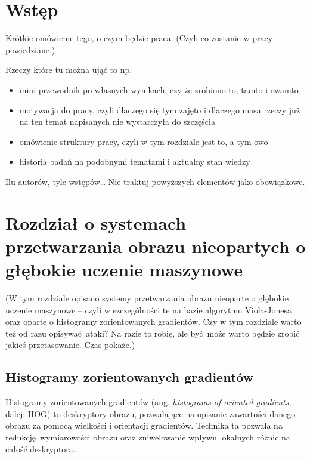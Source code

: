 \documentclass[12pt,a4paper,leqno,oneside,titlepage]{book}
\begin{document}
\mainmatter

\chapter*{Wstęp}

Krótkie omówienie tego, o czym będzie praca. (Czyli co zostanie w pracy powiedziane.)

Rzeczy które tu można ująć to np. 
\begin{itemize}
\item mini-przewodnik po własnych wynikach, czy że zrobiono to, tamto i owamto
\item motywacja do pracy, czyli dlaczego się tym zajęto i dlaczego masa rzeczy już na ten temat napisanych nie wystarczyła do szczęścia
\item omówienie struktury pracy, czyli w tym rozdziale jest to, a tym owo
\item historia badań na podobnymi tematami i aktualny stan wiedzy
\end{itemize}

Ilu autorów, tyle wstępów\ldots{} Nie traktuj powyższych elementów jako obowiązkowe.

\chapter{Rozdział o systemach przetwarzania obrazu nieopartych o głębokie uczenie maszynowe}%

(W tym rozdziale opisano systemy przetwarzania obrazu nieoparte o głębokie uczenie maszynowe -- czyli w szczególności te na bazie algorytmu Viola-Jonesa oraz oparte o histogramy zorientowanych gradientów.
Czy w tym rozdziale warto też od razu opisywać ataki? Na razie to robię, ale być może warto będzie zrobić jakieś przetasowanie. Czas pokaże.)

\section{Histogramy zorientowanych gradientów}

Histogramy zorientowanych gradientów (ang. \textit{histograms of oriented gradients}, dalej: HOG) to deskryptory obrazu, pozwalające na opisanie zawartości danego obrazu za pomocą wielkości i orientacji gradientów. Technika ta pozwala na redukcję wymiarowości obrazu oraz zniwelowanie wpływu lokalnych różnic na całość deskryptora.\cite{DalalTriggs05Hog}
\end{document}
